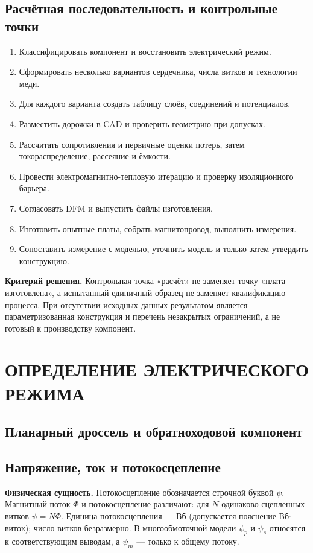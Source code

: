 \documentclass[14pt,a4paper]{extarticle}
\newcommand{\phys}{\par\noindent\textbf{Физическая сущность.} }
\newcommand{\criterion}{\par\noindent\textbf{Критерий решения.} }
\begin{document}
\subsection{Расчётная последовательность и контрольные точки}
\begin{enumerate}
\item Классифицировать компонент и восстановить электрический режим.
\item Сформировать несколько вариантов сердечника, числа витков и технологии меди.
\item Для каждого варианта создать таблицу слоёв, соединений и потенциалов.
\item Разместить дорожки в CAD и проверить геометрию при допусках.
\item Рассчитать сопротивления и первичные оценки потерь, затем токораспределение, рассеяние и ёмкости.
\item Провести электромагнитно-тепловую итерацию и проверку изоляционного барьера.
\item Согласовать DFM и выпустить файлы изготовления.
\item Изготовить опытные платы, собрать магнитопровод, выполнить измерения.
\item Сопоставить измерение с моделью, уточнить модель и только затем утвердить конструкцию.
\end{enumerate}
\criterion Контрольная точка «расчёт» не заменяет точку «плата изготовлена», а испытанный единичный образец не заменяет квалификацию процесса. При отсутствии исходных данных результатом является параметризованная конструкция и перечень незакрытых ограничений, а не готовый к производству компонент.

\section{ОПРЕДЕЛЕНИЕ ЭЛЕКТРИЧЕСКОГО РЕЖИМА}
\label{pl:mode}
\subsection{Планарный дроссель и обратноходовой компонент}

\subsection{Напряжение, ток и потокосцепление}
\phys Потокосцепление обозначается строчной буквой $\psi$. Магнитный поток $\Phi$ и потокосцепление различают: для $N$ одинаково сцепленных витков $\psi=N\Phi$. Единица потокосцепления --- Вб (допускается пояснение Вб$\cdot$виток); число витков безразмерно. В многообмоточной модели $\psi_p$ и $\psi_s$ относятся к соответствующим выводам, а $\psi_m$ --- только к общему потоку.
\end{document}
